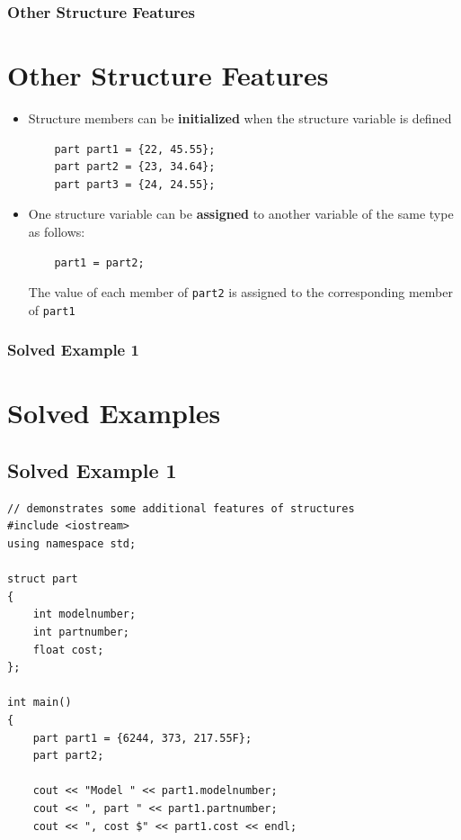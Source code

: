 \documentclass{beamer}
\begin{document}
\begin{frame} [fragile]
\frametitle{Other Structure Features}
\section{Other Structure Features} %
\label{sec:other_structure_features}
    \begin{itemize}
        \item Structure members can be \textbf{initialized} when the structure variable is defined
        \lstset{style=mystyle}
\begin{lstlisting}
    part part1 = {22, 45.55};
    part part2 = {23, 34.64};
    part part3 = {24, 24.55};

\end{lstlisting}
        \item One structure variable can be \textbf{assigned} to another variable of the same type as follows:
        \lstset{style=mystyle}
\begin{lstlisting}
    part1 = part2;

\end{lstlisting}
The value of each member of \texttt{part2} is assigned to the corresponding member of \texttt{part1}
    \end{itemize}
\end{frame}

\begin{frame} [fragile]
    \frametitle{Solved Example 1}
    \section{Solved Examples} %
    \label{sec:solved_examples}
    \subsection{Solved Example 1} %
    \label{sub:solved_example_1}
    \lstset{style=mystyle}
\begin{lstlisting}
// demonstrates some additional features of structures
#include <iostream>
using namespace std;

struct part
{
    int modelnumber;
    int partnumber;
    float cost;
};

int main()
{
    part part1 = {6244, 373, 217.55F};
    part part2;

    cout << "Model " << part1.modelnumber;
    cout << ", part " << part1.partnumber;
    cout << ", cost $" << part1.cost << endl;

\end{lstlisting}
\end{frame}
\end{document}
